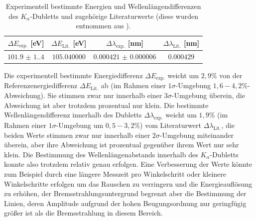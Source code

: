 \begin{table}[H]
	\centering
	\begin{tabular}{|c|c|c|c|} \hline
    $\Delta E_{\text{exp.}}$ [eV] & $\Delta E_{\text{Lit.}}$ [eV] & $\Delta \lambda_{\text{exp.}}$ [nm] & $\Delta \lambda_{\text{Lit.}}$ [nm]\\ \hline
    $\num{101.9(1.4)}$ &  $\num{105.040000}$ & $\num{0.000421(6)}$ & $\num{0.000429}$ \\
    \hline
	\end{tabular}
	\caption{Experimentell bestimmte Energien und Wellenlängendifferenzen des $K_\alpha$-Dubletts und zugehörige Literaturwerte (diese wurden entnommen aus \cite{xraydatabooklet}).}
	\label{tab:mo_diffs}
\end{table}

Die experimentell bestimmte Energiedifferenz $\Delta E_\text{exp.}$ weicht um $2,9\%$ von der Referenzenergiedifferenz $\Delta E_\text{Lit.}$ ab (im Rahmen einer $1\sigma$-Umgebung $1,6-4,2\%$-Abweichung). Sie stimmen zwar nur innerhalb einer $3\sigma$-Umgebung überein, die Abweichung ist aber trotzdem prozentual nur klein. Die bestimmte Wellenlängendifferenz innerhalb des Dubletts $\Delta \lambda_\text{exp.}$ weicht um $1,9\%$ (im Rahmen einer $1\sigma$-Umgebung um $0,5-3,2\%$) vom Literaturwert $\Delta \lambda_\text{Lit.}$, die beiden Werte stimmen zwar nur innerhalb einer $2\sigma$-Umgebung miteinander überein, aber ihre Abweichung ist prozentual gegenüber ihrem Wert nur sehr klein. Die Bestimmung des Wellenlängenabstands innerhalb des $K_\alpha$-Dubletts konnte also trotzdem relativ genau erfolgen. Eine Verbesserung der Werte könnte zum Beispiel durch eine längere Messzeit pro Winkelschritt oder kleinere Winkelschritte erfolgen um das Rauschen zu verringern und die Energieauflösung zu erhöhen, der Bremsstrahlungsuntergrund begrenzt aber die Bestimmung der Linien, deren Amplitude aufgrund der hohen Beugungsordnung nur geringfügig größer ist als die Bremsstrahlung in diesem Bereich.
